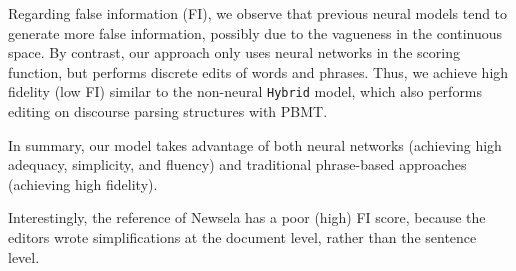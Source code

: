 \documentclass[11pt,a4paper]{article}
\begin{document}
Regarding false information (FI), we observe that previous neural models tend to generate more false information, possibly due to the vagueness in the continuous space. 
By contrast, our approach only uses neural networks in the scoring function, but performs discrete edits of words and phrases. Thus, we achieve high fidelity (low FI) similar to the non-neural {\tt Hybrid} model, which also performs editing on discourse parsing structures with PBMT.

In summary, our model takes advantage of both neural networks (achieving high adequacy, simplicity, and fluency) and traditional phrase-based approaches (achieving high fidelity).


Interestingly, the reference of Newsela has a poor (high) FI score, because the editors wrote simplifications at the document level, rather than the sentence level.

\begin{table}[t]
\centering
{}\caption{Human evaluation on Newsela, where we measure adequacy (A), simplicity (S), fluency (F), and their average score (Avg), based on 1--5 Likert scale. We also count average instances of false information per sentence (FI).}\vspace{-.2cm}
\end{table}
\end{document}
